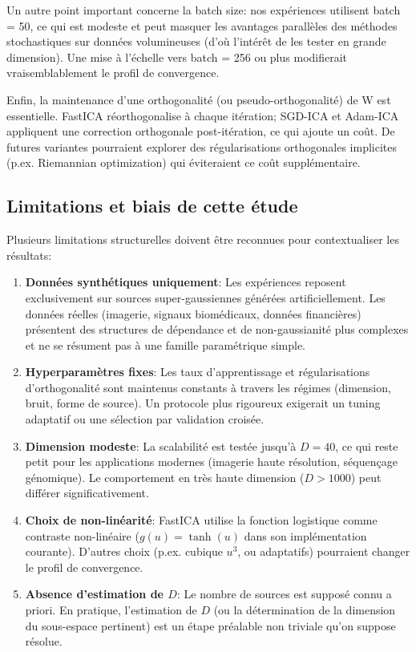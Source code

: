 \documentclass[11pt,a4paper]{article}
\begin{document}
Un autre point important concerne la batch size: nos expériences utilisent batch = 50, ce qui est modeste et peut masquer les avantages parallèles des méthodes stochastiques sur données volumineuses (d'où l'intérêt de les tester en grande dimension). Une mise à l'échelle vers batch = 256 ou plus modifierait vraisemblablement le profil de convergence.

Enfin, la maintenance d'une orthogonalité (ou pseudo-orthogonalité) de W est essentielle. FastICA réorthogonalise à chaque itération; SGD-ICA et Adam-ICA appliquent une correction orthogonale post-itération, ce qui ajoute un coût. De futures variantes pourraient explorer des régularisations orthogonales implicites (p.ex. Riemannian optimization) qui éviteraient ce coût supplémentaire.

\subsection{Limitations et biais de cette étude}

Plusieurs limitations structurelles doivent être reconnues pour contextualiser les résultats:

\begin{enumerate}
\item \textbf{Données synthétiques uniquement}: Les expériences reposent exclusivement sur sources super-gaussiennes générées artificiellement. Les données réelles (imagerie, signaux biomédicaux, données financières) présentent des structures de dépendance et de non-gaussianité plus complexes et ne se résument pas à une famille paramétrique simple.

\item \textbf{Hyperparamètres fixes}: Les taux d'apprentissage et régularisations d'orthogonalité sont maintenus constants à travers les régimes (dimension, bruit, forme de source). Un protocole plus rigoureux exigerait un tuning adaptatif ou une sélection par validation croisée.

\item \textbf{Dimension modeste}: La scalabilité est testée jusqu'à $D=40$, ce qui reste petit pour les applications modernes (imagerie haute résolution, séquençage génomique). Le comportement en très haute dimension ($D > 1000$) peut différer significativement.

\item \textbf{Choix de non-linéarité}: FastICA utilise la fonction logistique comme contraste non-linéaire ($g(u) = \tanh(u)$ dans son implémentation courante). D'autres choix (p.ex. cubique $u^3$, ou adaptatifs) pourraient changer le profil de convergence.

\item \textbf{Absence d'estimation de $D$}: Le nombre de sources est supposé connu a priori. En pratique, l'estimation de $D$ (ou la détermination de la dimension du sous-espace pertinent) est un étape préalable non triviale qu'on suppose résolue.
\end{enumerate}
\end{document}
